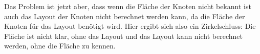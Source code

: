Das Problem ist jetzt aber, dass wenn die Fläche der Knoten nicht bekannt ist auch das Layout der Knoten nicht berechnet werden kann, da die Fläche der Knoten für das Layout benötigt wird. Hier ergibt sich also ein Zirkelschluss: Die Fläche ist nicht klar, ohne das Layout und das Layout kann nicht berechnet werden, ohne die Fläche zu kennen.
